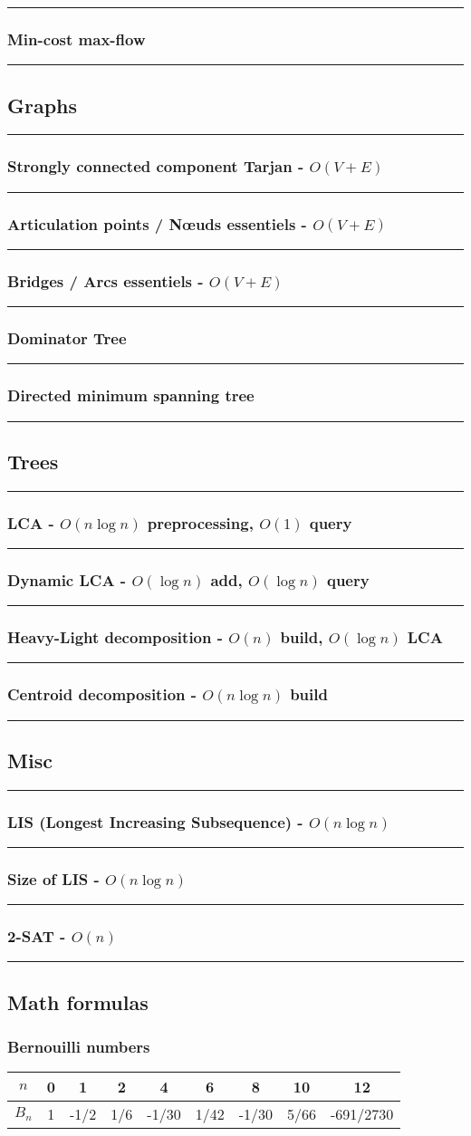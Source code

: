 \documentclass[landscape,a4paper,twocolumn,10pt]{report}
\renewcommand{\line}{\noindent\rule{\linewidth}{1pt}}
\newcommand{\algosection}[1]{\line \subsection*{#1}}
\newcommand{\algorithm}[1]{\line \subsubsection*{#1}}
\begin{document}
\algorithm{Min-cost max-flow}



\algosection{Graphs}
\label{graphs}

\algorithm{Strongly connected component Tarjan - $O(V + E)$}


%

\algorithm{Articulation points / N\oe uds essentiels - $O(V + E)$}


\algorithm{Bridges / Arcs essentiels - $O(V + E)$}


\algorithm{Dominator Tree}


\algorithm{Directed minimum spanning tree}


\algosection{Trees}
\label{trees}

\algorithm{LCA - $O(n \log n)$ preprocessing, $O(1)$ query}


\algorithm{Dynamic LCA - $O(\log n)$ add, $O(\log n)$ query}


\algorithm{Heavy-Light decomposition - $O(n)$ build, $O(\log n)$ LCA}


\algorithm{Centroid decomposition - $O(n \log n)$ build}



\algosection{Misc}
\label{misc}

\algorithm{LIS (Longest Increasing Subsequence) - $O(n \log n)$}


\algorithm{Size of LIS - $O(n \log n)$}


\algorithm{2-SAT - $O(n)$}


\algosection{Math formulas}
\label{mathformulas}

\subsubsection*{Bernouilli numbers}

\begin{tabular}{|c|c|c|c|c|c|c|c|c|}
\hline
$n$ & 0 & 1 & 2 & 4 & 6 & 8 & 10 & 12\\
\hline
$B_n$ & 1 & -1/2 & 1/6 & -1/30 & 1/42 & -1/30 & 5/66 & -691/2730 \\
\hline
\end{tabular}
\end{document}
